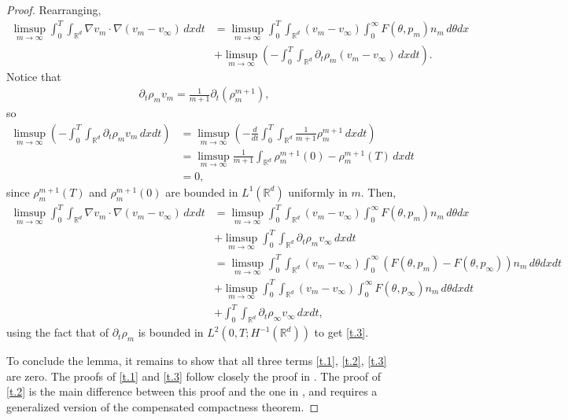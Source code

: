 \documentclass{amsart}
\def\R{\mathbb R}
\begin{document}
\begin{proof}
    Rearranging,
    \begin{align*}
        \limsup_{m \rightarrow \infty}\int_{0}^{T}\int_{\R^d}\nabla v_m\cdot \nabla (v_m-v_\infty)\, dx dt&=\limsup_{m \rightarrow \infty}\int_{0}^{T}\int_{\R^d}(v_m-v_\infty)\int_{0}^{\infty}F(\theta,p_m)n_m\, d\theta dx\\&+\limsup_{m\rightarrow\infty}(-\int_{0}^{T}\int_{\R^d}\partial_t \rho_m(v_m-v_\infty)\, dx dt).
    \end{align*}
    Notice that
    \begin{align*}
        \partial_t \rho_m v_m=\frac{1}{m+1}\partial_t(\rho_m^{m+1}),
    \end{align*}
    so 
    \begin{align*}
    \limsup_{m\rightarrow\infty}(- \int_{0}^{T}\int_{\R^d}\partial_t \rho_m v_m\, dx dt) &=\limsup_{m\rightarrow\infty}(-\frac{d}{dt}\int_{0}^{T}\int_{\R^d}\frac{1}{m+1}\rho_m^{m+1}\,dxdt) \\
        & =\limsup_{m\rightarrow\infty}\frac{1}{m+1}\int_{\R^d}\rho_m^{m+1}(0)-\rho_m^{m+1}(T)\, dx dt \\
        & = 0,
    \end{align*}
     since $\rho_m^{m+1}(T)$ and $\rho_m^{m+1}(0)$ are bounded in $L^1(\R^d)$ uniformly in $m$. Then,
    \begin{align}
        \limsup_{m \rightarrow \infty}\int_{0}^{T}\int_{\R^d}\nabla v_m\cdot \nabla (v_m-v_\infty)\, dx dt&=\limsup_{m \rightarrow \infty}\int_{0}^{T}\int_{\R^d}(v_m-v_\infty)\int_{0}^{\infty}F(\theta,p_m)n_m\, d\theta dx \nonumber \\&+\limsup_{m \rightarrow \infty}\int_{0}^{T}\int_{\R^d}\partial_t \rho_m v_\infty\, dx dt \nonumber \\
        &= \limsup_{m \rightarrow \infty}\int_{0}^{T}\int_{\R^d}(v_m-v_\infty)\int_{0}^{\infty}(F(\theta,p_m)-F(\theta,p_\infty))n_m\, d\theta dx dt \label{t.1}\\&+\limsup_{m \rightarrow \infty}\int_{0}^{T}\int_{\R^d}(v_m-v_\infty)\int_{0}^{\infty}F(\theta,p_\infty)n_m\,d\theta dx dt \label{t.2}\\
    &+\int_{0}^{T}\int_{\R^d}\partial_t \rho_\infty v_\infty\, dx dt, \label{t.3}
    \end{align}
    using the fact that of $\partial_t \rho_m $ is bounded in $L^2(0,T;H^{-1}(\R^d))$ to get \eqref{t.3}.
   
   
  To conclude the lemma, it remains to show that all three terms \eqref{t.1}, \eqref{t.2}, \eqref{t.3} are zero. The proofs of \eqref{t.1} and \eqref{t.3} follow closely the proof in \cite{david}. The proof of \eqref{t.2} is the main difference between this proof and the one in \cite{david}, and requires a generalized version of the compensated compactness theorem.
  

\end{proof}
\end{document}
